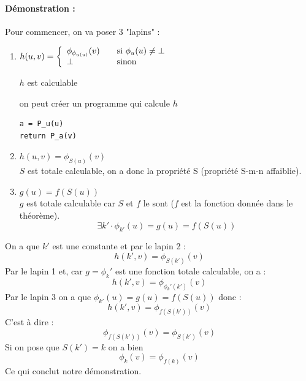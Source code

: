 \paragraph{Démonstration :}
Pour commencer, on va poser 3 "lapins" :
\begin{enumerate}
		
	\item
	$ h(u,v) = \left\{
	\begin{array}{l l}
		\phi_{\phi_{u(u)}}(v) & \quad \text{si $\phi_u(u)\neq \bot$}\\
    	\bot & \quad \text{sinon}
	\end{array} \right.$
		
		$h$ est calculable 
		\begin{myrem}
			on peut créer un programme qui calcule $h$
\begin{lstlisting}
a = P_u(u)
return P_a(v)
\end{lstlisting}
		\end{myrem}
		
	\item $h(u,v)=\phi_{S(u)}(v)$\\
	 $S$ est totale calculable, on a donc la propriété S (propriété S-m-n affaiblie).
	 
	\item $g(u)=f(S(u))$\\
	 $g$ est totale calculable car $S$ et $f$ le sont ($f$
		est la fonction donnée dans le théorème).
		\[ \exists k' \cdot \phi_{k'}(u) =g(u)=f(S(u)) \]
\end{enumerate}
On a que $k'$ est une constante et par le lapin 2 :
\[h(k',v) = \phi_{S(k')}(v)\]
Par le lapin 1 et, car $g=\phi_k'$ est une fonction totale calculable, on a :
\[h(k',v) = \phi_{\phi_k'(k')}(v)\]
Par le lapin 3 on a que $\phi_{k'}(u) = g(u)=f(S(u))$ donc :
\[h(k',v) = \phi_{f(S(k'))}(v)\]
C'est à dire :
\[ \phi_{f(S(k'))}(v) =\phi_{S(k')}(v) \]
Si on pose que $S(k')=k$ on a bien 
\[ \phi_{k}(v) = \phi_{f(k)}(v) \]
Ce qui conclut notre démonstration.

